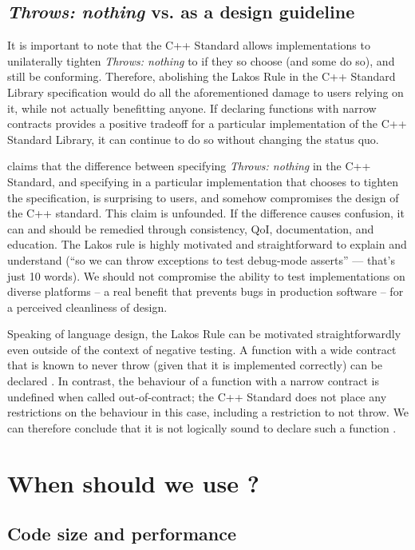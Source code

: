 \subsection{\emph{Throws: nothing} vs.  as a design guideline}

It is important to note that the C++ Standard allows implementations to unilaterally tighten \emph{Throws: nothing} to  if they so choose (and some do so), and still be conforming. Therefore, abolishing the Lakos Rule in the C++ Standard Library specification would do all the aforementioned damage to users relying on it, while not actually benefitting anyone. If declaring functions with narrow contracts  provides a positive tradeoff for a particular implementation of the C++ Standard Library, it can continue to do so without changing the status quo.

\cite{P1656R2} claims that the difference between specifying \emph{Throws: nothing} in the C++ Standard, and specifying  in a particular implementation that chooses to tighten the specification, is surprising to users, and somehow compromises the design of the C++ standard. This claim is unfounded. If the difference causes confusion, it can and should be remedied through consistency, QoI, documentation, and education. The Lakos rule is highly motivated and straightforward to explain and understand (``so we can throw exceptions to test debug-mode asserts'' --- that's just 10 words). We should not compromise the ability to test implementations on diverse platforms -- a real benefit that prevents bugs in production software -- for a perceived cleanliness of design.

Speaking of language design, the Lakos Rule can be motivated straightforwardly even outside of the context of negative testing. A function with a wide contract that is known to never throw (given that it is implemented correctly) can be declared . In contrast, the behaviour of a function with a narrow contract is undefined when called out-of-contract; the C++ Standard does not place any restrictions on the behaviour in this case, including a restriction to not throw. We can therefore conclude that it is not logically sound to declare such a function .
\section{When should we use ?}
\label{sec:noexcept}

\subsection{Code size and performance}

